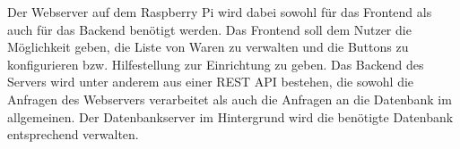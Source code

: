 Der Webserver auf dem Raspberry Pi wird dabei sowohl für das Frontend als auch für das Backend benötigt werden. Das Frontend soll dem Nutzer die Möglichkeit geben, die Liste von Waren zu verwalten und die Buttons zu konfigurieren bzw. Hilfestellung zur Einrichtung zu geben. Das Backend des Servers wird unter anderem aus einer \ac{REST} \ac{API} bestehen, die sowohl die Anfragen des Webservers verarbeitet als auch die Anfragen an die Datenbank im allgemeinen. 
Der Datenbankserver im Hintergrund wird die benötigte Datenbank entsprechend verwalten. 